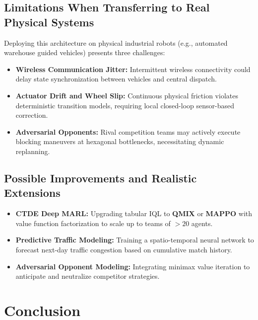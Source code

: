 \documentclass[11pt,a4paper]{article}
\begin{document}
\subsection{Limitations When Transferring to Real Physical Systems}
Deploying this architecture on physical industrial robots (e.g., automated warehouse guided vehicles) presents three challenges:
\begin{itemize}
    \item \textbf{Wireless Communication Jitter:} Intermittent wireless connectivity could delay state synchronization between vehicles and central dispatch.
    \item \textbf{Actuator Drift and Wheel Slip:} Continuous physical friction violates deterministic transition models, requiring local closed-loop sensor-based correction.
    \item \textbf{Adversarial Opponents:} Rival competition teams may actively execute blocking maneuvers at hexagonal bottlenecks, necessitating dynamic replanning.
\end{itemize}

\subsection{Possible Improvements and Realistic Extensions}
\begin{itemize}
    \item \textbf{CTDE Deep MARL:} Upgrading tabular IQL to \textbf{QMIX} or \textbf{MAPPO} with value function factorization to scale up to teams of $>20$ agents.
    \item \textbf{Predictive Traffic Modeling:} Training a spatio-temporal neural network to forecast next-day traffic congestion based on cumulative match history.
    \item \textbf{Adversarial Opponent Modeling:} Integrating minimax value iteration to anticipate and neutralize competitor strategies.
\end{itemize}

\section{Conclusion}
\end{document}
